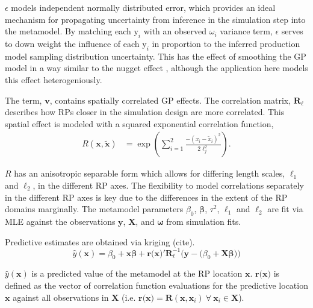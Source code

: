 \documentclass[12pt]{article}
\begin{document}
$\epsilon$ models independent normally distributed error, which provides an 
ideal mechanism for propagating uncertainty from inference in the simulation 
step into the metamodel. By matching each $\text{y}_i$ with an observed $\omega_i$ 
variance term, $\epsilon$ serves to down weight the influence of each $\text{y}_i$ 
in proportion to the inferred production model sampling distribution 
uncertainty. This has the effect of smoothing the GP model in a way similar to 
the nugget effect , although the application 
here models this effect heterogeniously.

The term, $\bm{v}$, contains spatially correlated GP effects. The correlation 
matrix, $\bm{R_{\ell}}$ describes how RPs closer in the simulation design are more 
correlated. This spatial effect is modeled with a squared exponential correlation function,
%
\begin{align}   \label{corModel}
R(\bm{x}, \bm{\tilde x}) &= \exp\left( \sum_{i=1}^2 \frac{-(x_{i}-\tilde x_{i})^2}{2\ell_j^2} \right). 
\end{align}

$R$ has an anisotropic separable form which allows for differing length scales, 
$\ell_1$ and $\ell_2$, in the different RP axes. The flexibility to model 
correlations separately in the different RP axes is key due to the differences 
in the extent of the RP domains marginally. 
The metamodel parameters $\beta_0$, $\bm{\beta}$, $\tau^2$,
$\ell_1$ and $\ell_2$ are fit via MLE against the observations $\textbf{y}$, $\bm{X}$,
and $\bm{\omega}$ from simulation fits.

%
Predictive estimates are obtained via kriging {(\color{red}cite)}. 
\begin{equation} %
	\hat y(\textbf{x}) = \beta_0 + \textbf{x}\bm{\beta} + \textbf{r(x)}'\bm{R}^{-1}_{\bm{\ell}}\Big(\textbf{y}-\big(\beta_0+\bm{X}\bm{\beta}\big)\Big)
\end{equation}

%
$\hat y(\textbf{x})$ is a predicted value of the metamodel at the 
RP location $\textbf{x}$. $\textbf{r(x)}$ is defined as the vector of correlation 
function evaluations for the predictive location $\textbf{x}$ against all observations 
in $\bm{X}$ (i.e. $\textbf{r(x)}=\bm{R}(\textbf{x}, \bm{x}_i)~\forall~\bm{x}_i\in\bm{X}$).
\end{document}
